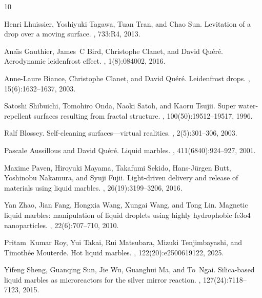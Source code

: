 \documentclass[twocolumn, prl,
 amsmath,amssymb,
 superscriptaddress,aps,
]{revtex4-2}
\begin{document}
\begin{thebibliography}{10}
	
	Henri Lhuissier, Yoshiyuki Tagawa, Tuan Tran, and Chao Sun.
	\newblock Levitation of a drop over a moving surface.
	, 733:R4, 2013.
	
	Ana{\"\i}s Gauthier, James~C Bird, Christophe Clanet, and David Qu{\'e}r{\'e}.
	\newblock Aerodynamic leidenfrost effect.
	, 1(8):084002, 2016.
	
	Anne-Laure Biance, Christophe Clanet, and David Qu{\'e}r{\'e}.
	\newblock Leidenfrost drops.
	, 15(6):1632--1637, 2003.
	
	Satoshi Shibuichi, Tomohiro Onda, Naoki Satoh, and Kaoru Tsujii.
	\newblock Super water-repellent surfaces resulting from fractal structure.
	, 100(50):19512--19517, 1996.
	
	Ralf Blossey.
	\newblock Self-cleaning surfaces—virtual realities.
	, 2(5):301--306, 2003.
	
	Pascale Aussillous and David Qu{\'e}r{\'e}.
	\newblock Liquid marbles.
	, 411(6840):924--927, 2001.
	
	Maxime Paven, Hiroyuki Mayama, Takafumi Sekido, Hans-J{\"u}rgen Butt, Yoshinobu
	Nakamura, and Syuji Fujii.
	\newblock Light-driven delivery and release of materials using liquid marbles.
	, 26(19):3199--3206, 2016.
	
	Yan Zhao, Jian Fang, Hongxia Wang, Xungai Wang, and Tong Lin.
	\newblock Magnetic liquid marbles: manipulation of liquid droplets using highly
	hydrophobic fe3o4 nanoparticles.
	, 22(6):707--710, 2010.
	
	Pritam~Kumar Roy, Yui Takai, Rui Matsubara, Mizuki Tenjimbayashi, and
	Timoth{\'e}e Mouterde.
	\newblock Hot liquid marbles.
	,
	122(20):e2500619122, 2025.
	
	Yifeng Sheng, Guanqing Sun, Jie Wu, Guanghui Ma, and To~Ngai.
	\newblock Silica-based liquid marbles as microreactors for the silver mirror
	reaction.
	, 127(24):7118--7123, 2015.
	

\end{thebibliography}
\end{document}
